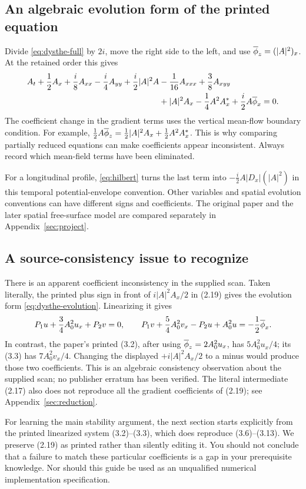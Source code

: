 \subsection{An algebraic evolution form of the printed equation}
Divide \eqref{eq:dysthe-full} by $2i$, move the right side to the left,
and use $\overline{\phi}_z=(|A|^2)_x$. At the retained order this gives
\begin{align}
 A_t+\frac12A_x+\frac i8A_{xx}-\frac i4A_{yy}
 +\frac i2|A|^2A
 &-\frac1{16}A_{xxx}+\frac38A_{xyy}\notag\\
 &+|A|^2A_x-\frac14A^2A_x^*
 +\frac i2A\overline{\phi}_x=0.
 \label{eq:dysthe-evolution}
\end{align}
The coefficient change in the gradient terms uses the vertical mean-flow
boundary condition. For example,
$\tfrac12A\overline{\phi}_z=\tfrac12|A|^2A_x+\tfrac12A^2A_x^*$.
This is why comparing partially reduced equations can make coefficients
appear inconsistent. Always record which mean-field terms have been eliminated.

For a longitudinal profile, \eqref{eq:hilbert} turns the last term into
$-\tfrac i2A|D_x|(|A|^2)$ in this temporal potential-envelope convention.
Other variables and spatial evolution conventions can have different signs
and coefficients. The original paper and the later spatial free-surface
model are compared separately in Appendix~\ref{sec:project}.

\subsection{A source-consistency issue to recognize}
\label{sec:source-consistency}
There is an apparent coefficient inconsistency in the supplied scan.
Taken literally, the printed plus sign in front of
$i|A|^2A_x/2$ in (2.19) gives the evolution form
\eqref{eq:dysthe-evolution}. Linearizing it gives
\[
 P_1u+\frac34A_0^2u_x+P_2v=0,\qquad
 P_1v+\frac54A_0^2v_x-P_2u+A_0^2u=-\frac12\overline{\phi}_x.
\]
In contrast, the paper's printed (3.2), after using
$\overline{\phi}_z=2A_0^2u_x$, has $5A_0^2u_x/4$; its (3.3) has
$7A_0^2v_x/4$. Changing the displayed $+i|A|^2A_x/2$ to a minus
would produce those two coefficients. This is an algebraic consistency
observation about the supplied scan; no publisher erratum has been verified.
The literal intermediate (2.17) also does not reproduce all the gradient
coefficients of (2.19); see Appendix~\ref{sec:reduction}.

For learning the main stability argument, the next section starts explicitly
from the printed linearized system (3.2)--(3.3), which does reproduce
(3.6)--(3.13). We preserve (2.19) as printed rather than silently editing
it. You should not conclude that a failure to match these particular
coefficients is a gap in your prerequisite knowledge. Nor should this guide
be used as an unqualified numerical implementation specification.

